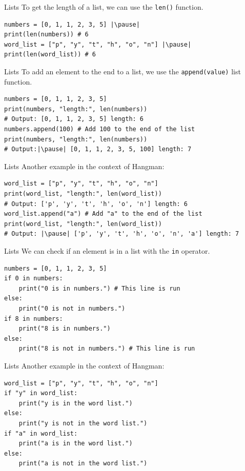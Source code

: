 \documentclass[dvipsnames, svgnames, x11names]{beamer}
\begin{document}
\begin{frame}[fragile]{Lists}
To get the length of a list, we can use the \texttt{len()} function. \pause
\begin{verbatim}
numbers = [0, 1, 1, 2, 3, 5] |\pause|
print(len(numbers)) # 6 
word_list = ["p", "y", "t", "h", "o", "n"] |\pause|
print(len(word_list)) # 6
\end{verbatim}
\end{frame}

\begin{frame}[fragile]{Lists}
To add an element to the end to a list, we use the \texttt{append(value)} list function. \pause
\begin{verbatim}
numbers = [0, 1, 1, 2, 3, 5]
print(numbers, "length:", len(numbers)) 
# Output: [0, 1, 1, 2, 3, 5] length: 6
numbers.append(100) # Add 100 to the end of the list
print(numbers, "length:", len(numbers))
# Output:|\pause| [0, 1, 1, 2, 3, 5, 100] length: 7
\end{verbatim}
\end{frame}

\begin{frame}[fragile]{Lists}
Another example in the context of Hangman:
\begin{verbatim}
word_list = ["p", "y", "t", "h", "o", "n"]
print(word_list, "length:", len(word_list)) 
# Output: ['p', 'y', 't', 'h', 'o', 'n'] length: 6
word_list.append("a") # Add "a" to the end of the list
print(word_list, "length:", len(word_list))  
# Output: |\pause| ['p', 'y', 't', 'h', 'o', 'n', 'a'] length: 7
\end{verbatim}
\end{frame}

\begin{frame}[fragile]{Lists}
We can check if an element is in a list with the \texttt{in} operator.\pause

\begin{verbatim}
numbers = [0, 1, 1, 2, 3, 5]
if 0 in numbers:
    print("0 is in numbers.") # This line is run
else:
    print("0 is not in numbers.")
if 8 in numbers:
    print("8 is in numbers.")
else:
    print("8 is not in numbers.") # This line is run
\end{verbatim}
\end{frame}

\begin{frame}[fragile]{Lists}
Another example in the context of Hangman:

\begin{verbatim}
word_list = ["p", "y", "t", "h", "o", "n"]
if "y" in word_list:
    print("y is in the word list.")
else:
    print("y is not in the word list.")
if "a" in word_list:
    print("a is in the word list.")
else:
    print("a is not in the word list.")
\end{verbatim}
\end{frame}
\end{document}
